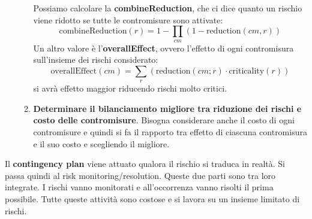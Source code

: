 \begin{enumerate}
\begin{enumerate}
                    Possiamo calcolare la \textbf{combineReduction}, che ci dice
                    quanto un rischio viene ridotto se tutte le contromisure sono
                    attivate:
                    \begin{equation}
                        \text{combineReduction}(r) = 1 - \prod_{cm}(1 -
                        \text{reduction}(cm, r))
                    \end{equation}
                    Un altro valore è l'\textbf{overallEffect}, ovvero l'effetto
                    di ogni contromisura sull'insieme dei rischi considerato:
                    \begin{equation}
                        \text{overallEffect}(cm) = \sum_{r} (\text{reduction}(cm; r)
                        \cdot \text{criticality}(r))
                    \end{equation}
                    si avrà effetto maggior riducendo rischi molto critici.
              \item \textbf{Determinare il bilanciamento migliore tra riduzione
                        dei rischi e costo delle contromisure}.
                    Bisogna considerare anche il costo di ogni contromisure e
                    quindi si fa il rapporto tra effetto di ciascuna contromisura
                    e il suo costo e scegliendo il migliore.
          \end{enumerate}
\end{enumerate}
Il \textbf{contingency plan} viene attuato qualora il rischio si traduca in realtà.
Si passa quindi al risk monitoring/resolution. Queste due parti sono tra loro
integrate. I rischi vanno monitorati e all'occorrenza vanno risolti il prima
possibile. Tutte queste attività sono costose e si lavora su un insieme limitato
di rischi.